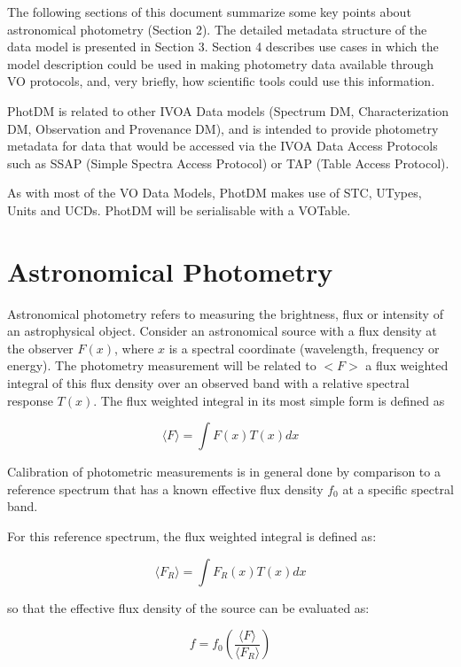 \documentclass[11pt,a4paper]{ivoa}
\begin{document}
The following sections of this document summarize some key points
about astronomical photometry (Section 2). The detailed metadata
structure of the data model is presented in Section 3. Section 4
describes use cases in which the model description could be used in
making photometry data available through VO protocols, and, very briefly,
how scientific tools could use this information.


PhotDM is related to other IVOA Data models (Spectrum DM, Characterization DM,
Observation and Provenance DM),  and is intended to provide photometry
metadata for data that would be accessed via the IVOA Data Access Protocols
such as SSAP (Simple Spectra Access Protocol) or TAP (Table Access Protocol).

As with most of the VO Data Models, PhotDM makes use of STC, UTypes, Units
and UCDs. PhotDM will be serialisable with a VOTable.

\section{Astronomical Photometry}
Astronomical photometry refers to measuring the brightness, flux or
intensity of an astrophysical object. Consider an astronomical source
with a flux density at the observer $F(x)$, where $x$ is a spectral coordinate
(wavelength, frequency or energy).  The photometry measurement will be related
to $<F>$ a flux weighted integral of this flux density over an observed band
with a relative spectral response $T(x)$. The flux weighted integral in its most
simple form is defined as


\begin{equation} \label{eq:1}
\langle F\rangle = \int F(x)T(x)dx
\end{equation}

Calibration of photometric measurements is in general done by comparison to a
reference spectrum that has a known effective flux density $f_0$ at a specific
spectral band.


For this reference spectrum, the flux weighted integral is defined as:

\begin{equation} \label{eq:2}
\langle F_R \rangle= \int F_R (x)T(x)dx
\end{equation}


so that the effective flux density of the source can be evaluated as:

\begin{equation} \label{eq:3}
f = f_0 ( \frac{\langle F\rangle }{\langle F_R \rangle } )
\end{equation}
\end{document}
